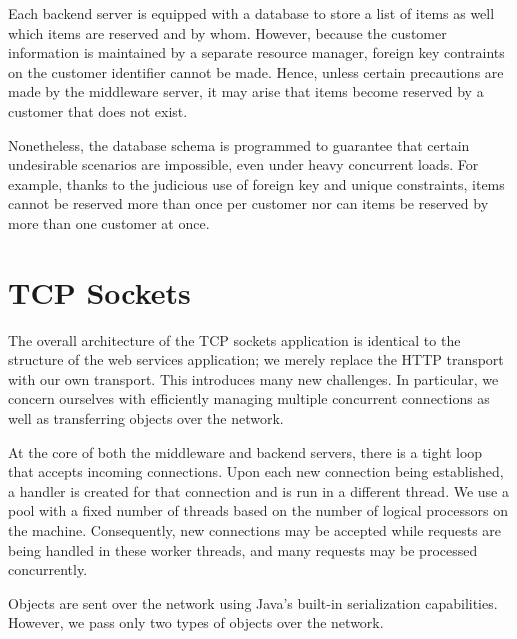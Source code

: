 \documentclass[letterpaper,11pt]{article}
\begin{document}
Each backend server is equipped with a database to store a list of items as
well which items are reserved and by whom. However, because the customer
information is maintained by a separate resource manager, foreign key
contraints on the customer identifier cannot be made. Hence, unless certain
precautions are made by the middleware server, it may arise that items become
reserved by a customer that does not exist.

Nonetheless, the database schema is programmed to guarantee that certain
undesirable scenarios are impossible, even under heavy concurrent loads. For
example, thanks to the judicious use of foreign key and unique constraints,
items cannot be reserved more than once per customer nor can items be reserved
by more than one customer at once.

\section*{TCP Sockets}

The overall architecture of the TCP sockets application is identical to the
structure of the web services application; we merely replace the HTTP transport
with our own transport. This introduces many new challenges. In particular, we
concern ourselves with efficiently managing multiple concurrent connections as
well as transferring objects over the network.

At the core of both the middleware and backend servers, there is a tight loop
that accepts incoming connections. Upon each new connection being established,
a handler is created for that connection and is run in a different thread. We
use a pool with a fixed number of threads based on the number of logical
processors on the machine. Consequently, new connections may be accepted while
requests are being handled in these worker threads, and many requests may be
processed concurrently.

Objects are sent over the network using Java's built-in serialization
capabilities. However, we pass only two types of objects over the network.
\end{document}
